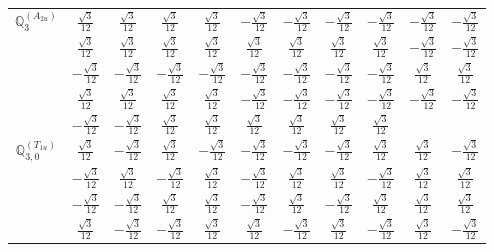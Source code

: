 \documentclass[fleqn,10pt,landscape]{article}
\begin{document}
\begin{itemize}
{\begin{center}
\begin{longtable}{ccccccccccc}
$\mathbb{Q}_{3}^{(A_{2u})}$ & $ \frac{\sqrt{3}}{12} $ & $ \frac{\sqrt{3}}{12} $ & $ \frac{\sqrt{3}}{12} $ & $ \frac{\sqrt{3}}{12} $ & $ - \frac{\sqrt{3}}{12} $ & $ - \frac{\sqrt{3}}{12} $ & $ - \frac{\sqrt{3}}{12} $ & $ - \frac{\sqrt{3}}{12} $ & $ - \frac{\sqrt{3}}{12} $ & $ - \frac{\sqrt{3}}{12} $ \\
& $ \frac{\sqrt{3}}{12} $ & $ \frac{\sqrt{3}}{12} $ & $ \frac{\sqrt{3}}{12} $ & $ \frac{\sqrt{3}}{12} $ & $ \frac{\sqrt{3}}{12} $ & $ \frac{\sqrt{3}}{12} $ & $ \frac{\sqrt{3}}{12} $ & $ \frac{\sqrt{3}}{12} $ & $ - \frac{\sqrt{3}}{12} $ & $ - \frac{\sqrt{3}}{12} $ \\
& $ - \frac{\sqrt{3}}{12} $ & $ - \frac{\sqrt{3}}{12} $ & $ - \frac{\sqrt{3}}{12} $ & $ - \frac{\sqrt{3}}{12} $ & $ - \frac{\sqrt{3}}{12} $ & $ - \frac{\sqrt{3}}{12} $ & $ - \frac{\sqrt{3}}{12} $ & $ - \frac{\sqrt{3}}{12} $ & $ \frac{\sqrt{3}}{12} $ & $ \frac{\sqrt{3}}{12} $ \\
& $ \frac{\sqrt{3}}{12} $ & $ \frac{\sqrt{3}}{12} $ & $ \frac{\sqrt{3}}{12} $ & $ \frac{\sqrt{3}}{12} $ & $ - \frac{\sqrt{3}}{12} $ & $ - \frac{\sqrt{3}}{12} $ & $ - \frac{\sqrt{3}}{12} $ & $ - \frac{\sqrt{3}}{12} $ & $ - \frac{\sqrt{3}}{12} $ & $ - \frac{\sqrt{3}}{12} $ \\
& $ - \frac{\sqrt{3}}{12} $ & $ - \frac{\sqrt{3}}{12} $ & $ \frac{\sqrt{3}}{12} $ & $ \frac{\sqrt{3}}{12} $ & $ \frac{\sqrt{3}}{12} $ & $ \frac{\sqrt{3}}{12} $ & $ \frac{\sqrt{3}}{12} $ & $ \frac{\sqrt{3}}{12} $ & $  $ & $  $ \\ \hline
$\mathbb{Q}_{3,0}^{(T_{1u})}$ & $ \frac{\sqrt{3}}{12} $ & $ - \frac{\sqrt{3}}{12} $ & $ \frac{\sqrt{3}}{12} $ & $ - \frac{\sqrt{3}}{12} $ & $ - \frac{\sqrt{3}}{12} $ & $ - \frac{\sqrt{3}}{12} $ & $ - \frac{\sqrt{3}}{12} $ & $ \frac{\sqrt{3}}{12} $ & $ \frac{\sqrt{3}}{12} $ & $ - \frac{\sqrt{3}}{12} $ \\
& $ - \frac{\sqrt{3}}{12} $ & $ \frac{\sqrt{3}}{12} $ & $ - \frac{\sqrt{3}}{12} $ & $ \frac{\sqrt{3}}{12} $ & $ - \frac{\sqrt{3}}{12} $ & $ \frac{\sqrt{3}}{12} $ & $ \frac{\sqrt{3}}{12} $ & $ - \frac{\sqrt{3}}{12} $ & $ \frac{\sqrt{3}}{12} $ & $ \frac{\sqrt{3}}{12} $ \\
& $ - \frac{\sqrt{3}}{12} $ & $ - \frac{\sqrt{3}}{12} $ & $ \frac{\sqrt{3}}{12} $ & $ \frac{\sqrt{3}}{12} $ & $ - \frac{\sqrt{3}}{12} $ & $ \frac{\sqrt{3}}{12} $ & $ - \frac{\sqrt{3}}{12} $ & $ \frac{\sqrt{3}}{12} $ & $ \frac{\sqrt{3}}{12} $ & $ \frac{\sqrt{3}}{12} $ \\
& $ \frac{\sqrt{3}}{12} $ & $ - \frac{\sqrt{3}}{12} $ & $ - \frac{\sqrt{3}}{12} $ & $ \frac{\sqrt{3}}{12} $ & $ \frac{\sqrt{3}}{12} $ & $ - \frac{\sqrt{3}}{12} $ & $ \frac{\sqrt{3}}{12} $ & $ - \frac{\sqrt{3}}{12} $ & $ \frac{\sqrt{3}}{12} $ & $ - \frac{\sqrt{3}}{12} $ \\

\end{longtable}
\end{center}}
\end{itemize}
\end{document}
